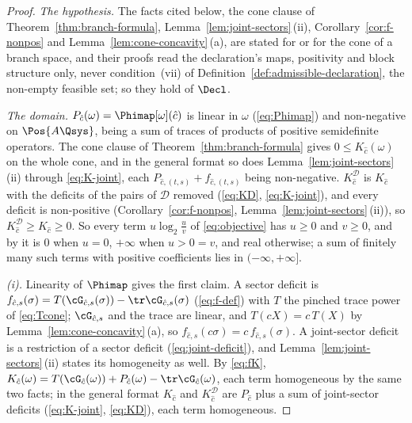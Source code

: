 \begin{proof}
\emph{The hypothesis.} The facts cited below, the cone clause of
Theorem~\ref{thm:branch-formula}, Lemma~\ref{lem:joint-sectors}\,(ii),
Corollary~\ref{cor:f-nonpos} and Lemma~\ref{lem:cone-concavity}\,(a), are
stated for  or for the
cone of a branch space, and
their proofs read the declaration's maps, positivity and block structure
only, never condition~(vii) of Definition~\ref{def:admissible-declaration},
the non-empty feasible set; so they hold of $\Decl$.

\emph{The domain.} $P_{\hat c}(\omega)=\Phimap[\omega](\hat c)$ is linear in
$\omega$ (\eqref{eq:Phimap}) and non-negative on $\Pos{A\Qsys}$, being a sum
of traces of products of positive semidefinite operators. The cone clause of
Theorem~\ref{thm:branch-formula} gives $0\le K_{\hat c}(\omega)$ on the
whole cone, and in the general format so does Lemma~\ref{lem:joint-sectors}\,(ii)
through \eqref{eq:K-joint}, each $P_{\hat c,(t,s)}+f_{\hat c,(t,s)}$ being
non-negative. $K^{\mathcal{D}}_{\hat c}$ is $K_{\hat c}$ with the deficits
of the pairs of $\mathcal{D}$ removed (\eqref{eq:KD}, \eqref{eq:K-joint}), and
every deficit is non-positive (Corollary~\ref{cor:f-nonpos},
Lemma~\ref{lem:joint-sectors}\,(ii)), so $K^{\mathcal{D}}_{\hat c}\ge
K_{\hat c}\ge0$. So every term $u\log_2\frac uv$ of \eqref{eq:objective} has
$u\ge0$ and $v\ge0$, and by  it is $0$ when $u=0$,
$+\infty$ when $u>0=v$, and real otherwise; a sum of finitely many such terms
with positive coefficients lies in $(-\infty,+\infty]$.

\emph{(i).} Linearity of $\Phimap$ gives the first claim. A sector deficit is
$f_{\hat c,s}(\sigma)=T(\cG_{\hat c,s}(\sigma))-\tr\cG_{\hat c,s}(\sigma)$
(\eqref{eq:f-def}) with $T$ the pinched trace power of \eqref{eq:Tcone};
$\cG_{\hat c,s}$ and the trace are linear, and $T(cX)=c\,T(X)$ by
Lemma~\ref{lem:cone-concavity}\,(a), so $f_{\hat c,s}(c\sigma)
=c\,f_{\hat c,s}(\sigma)$. A joint-sector deficit is a restriction of a
sector deficit (\eqref{eq:joint-deficit}), and
Lemma~\ref{lem:joint-sectors}\,(ii) states its homogeneity as well. By
\eqref{eq:fK},
$K_{\hat c}(\omega)=T(\cG_{\hat c}(\omega))+P_{\hat c}(\omega)
-\tr\cG_{\hat c}(\omega)$, each term homogeneous by the same two facts; in
the general format $K_{\hat c}$ and $K^{\mathcal{D}}_{\hat c}$ are $P_{\hat c}$
plus a sum of joint-sector deficits (\eqref{eq:K-joint}, \eqref{eq:KD}),
each term homogeneous.


\end{proof}
